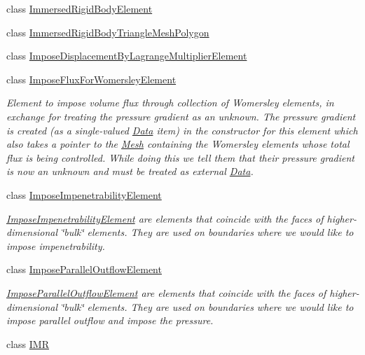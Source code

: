 \begin{DoxyCompactItemize}
class \hyperlink{classoomph_1_1ImmersedRigidBodyElement}{Immersed\+Rigid\+Body\+Element}
\item 
class \hyperlink{classoomph_1_1ImmersedRigidBodyTriangleMeshPolygon}{Immersed\+Rigid\+Body\+Triangle\+Mesh\+Polygon}
\item 
class \hyperlink{classoomph_1_1ImposeDisplacementByLagrangeMultiplierElement}{Impose\+Displacement\+By\+Lagrange\+Multiplier\+Element}
\item 
class \hyperlink{classoomph_1_1ImposeFluxForWomersleyElement}{Impose\+Flux\+For\+Womersley\+Element}
\begin{DoxyCompactList}\small\item\em Element to impose volume flux through collection of Womersley elements, in exchange for treating the pressure gradient as an unknown. The pressure gradient is created (as a single-\/valued \hyperlink{classoomph_1_1Data}{Data} item) in the constructor for this element which also takes a pointer to the \hyperlink{classoomph_1_1Mesh}{Mesh} containing the Womersley elements whose total flux is being controlled. While doing this we tell them that their pressure gradient is now an unknown and must be treated as external \hyperlink{classoomph_1_1Data}{Data}. \end{DoxyCompactList}\item 
class \hyperlink{classoomph_1_1ImposeImpenetrabilityElement}{Impose\+Impenetrability\+Element}
\begin{DoxyCompactList}\small\item\em \hyperlink{classoomph_1_1ImposeImpenetrabilityElement}{Impose\+Impenetrability\+Element} are elements that coincide with the faces of higher-\/dimensional \char`\"{}bulk\char`\"{} elements. They are used on boundaries where we would like to impose impenetrability. \end{DoxyCompactList}\item 
class \hyperlink{classoomph_1_1ImposeParallelOutflowElement}{Impose\+Parallel\+Outflow\+Element}
\begin{DoxyCompactList}\small\item\em \hyperlink{classoomph_1_1ImposeParallelOutflowElement}{Impose\+Parallel\+Outflow\+Element} are elements that coincide with the faces of higher-\/dimensional \char`\"{}bulk\char`\"{} elements. They are used on boundaries where we would like to impose parallel outflow and impose the pressure. \end{DoxyCompactList}\item 
class \hyperlink{classoomph_1_1IMR}{I\+MR}

\end{DoxyCompactItemize}

